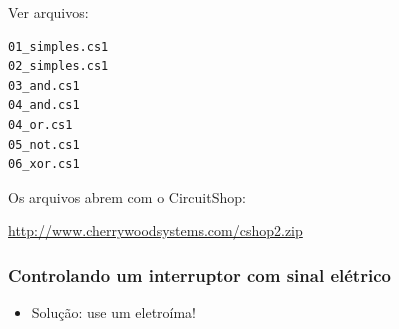 \documentclass{beamer}
\begin{document}
\begin{frame}[fragile]

Ver arquivos:

\begin{verbatim}
01_simples.cs1
02_simples.cs1	
03_and.cs1	
04_and.cs1
04_or.cs1
05_not.cs1
06_xor.cs1
\end{verbatim}

Os arquivos abrem com o CircuitShop:

\url{http://www.cherrywoodsystems.com/cshop2.zip}

\end{frame}


\begin{frame}
\frametitle{Controlando um interruptor com sinal elétrico}

\begin{itemize}
\item Solução: use um eletroíma!
\end{itemize}


\end{frame}
\end{document}

